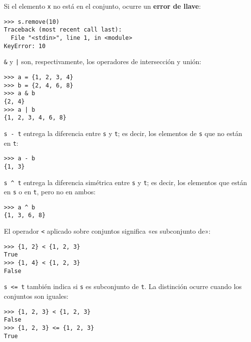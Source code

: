 Si el elemento \lstinline!x! no está en el conjunto, ocurre un
\textbf{error de llave}:

\begin{lstlisting}
>>> s.remove(10)
Traceback (most recent call last):
  File "<stdin>", line 1, in <module>
KeyError: 10
\end{lstlisting}

\lstinline!&! y \lstinline!|! son, respectivamente, los operadores de
intersección y unión:

\begin{lstlisting}
>>> a = {1, 2, 3, 4}
>>> b = {2, 4, 6, 8}
>>> a & b
{2, 4}
>>> a | b
{1, 2, 3, 4, 6, 8}
\end{lstlisting}

\lstinline!s - t! entrega la diferencia entre \lstinline!s! y
\lstinline!t!; es decir, los elementos de \lstinline!s! que no están en
\lstinline!t!:

\begin{lstlisting}
>>> a - b
{1, 3}
\end{lstlisting}

\lstinline!s ^ t! entrega la diferencia simétrica entre \lstinline!s! y
\lstinline!t!; es decir, los elementos que están en \lstinline!s! o en
\lstinline!t!, pero no en ambos:

\begin{lstlisting}
>>> a ^ b
{1, 3, 6, 8}
\end{lstlisting}

El operador \lstinline!<! aplicado sobre conjuntos significa «es
subconjunto de»:

\begin{lstlisting}
>>> {1, 2} < {1, 2, 3}
True
>>> {1, 4} < {1, 2, 3}
False
\end{lstlisting}

\lstinline!s <= t! también indica si \lstinline!s! es subconjunto de
\lstinline!t!. La distinción ocurre cuando los conjuntos son iguales:

\begin{lstlisting}
>>> {1, 2, 3} < {1, 2, 3}
False
>>> {1, 2, 3} <= {1, 2, 3}
True
\end{lstlisting}

